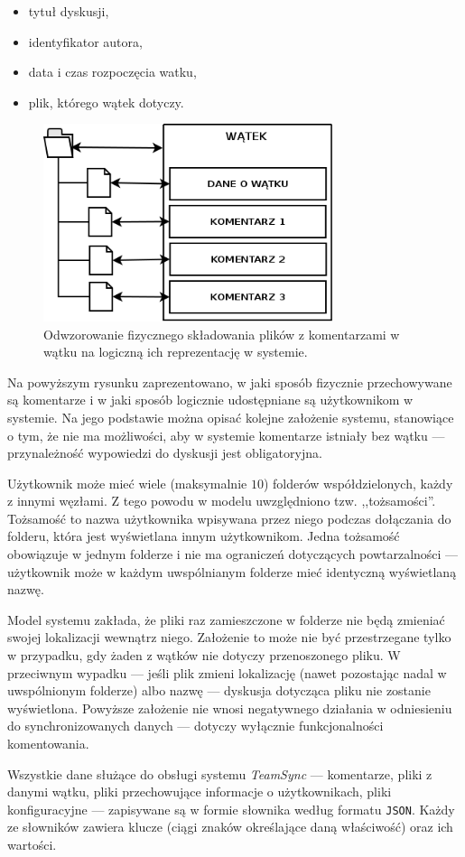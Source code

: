 \begin{itemize}[noitemsep]
 \item tytuł dyskusji,
 \item identyfikator autora,
 \item data i czas rozpoczęcia watku,
 \item plik, którego wątek dotyczy.
\end{itemize}

\begin{figure}[htb]
  \vspace{5pt}
  \begin{center}
    \includegraphics[width=240pt]{figures/folder-thread.png}
  \end{center}
  \caption{Odwzorowanie fizycznego składowania plików z komentarzami w wątku na logiczną ich reprezentację w systemie.}
\end{figure}

Na powyższym rysunku zaprezentowano, w jaki sposób fizycznie przechowywane są komentarze i w jaki sposób logicznie udostępniane są użytkownikom w systemie. Na jego podstawie można opisać kolejne założenie systemu, stanowiące o tym, że nie ma możliwości, aby w systemie komentarze istniały bez wątku --- przynależność wypowiedzi do dyskusji jest obligatoryjna.

Użytkownik może mieć wiele (maksymalnie $10$) folderów współdzielonych, każdy z innymi węzłami. Z tego powodu w modelu uwzględniono tzw. ,,tożsamości''. Tożsamość to nazwa użytkownika wpisywana przez niego podczas dołączania do folderu, która jest wyświetlana innym użytkownikom. Jedna tożsamość obowiązuje w jednym folderze i nie ma ograniczeń dotyczących powtarzalności --- użytkownik może w każdym uwspólnianym folderze mieć identyczną wyświetlaną nazwę.

Model systemu zakłada, że pliki raz zamieszczone w folderze nie będą zmieniać swojej lokalizacji wewnątrz niego. Założenie to może nie być przestrzegane tylko w przypadku, gdy żaden z wątków nie dotyczy przenoszonego pliku. W przeciwnym wypadku --- jeśli plik zmieni lokalizację (nawet pozostając nadal w uwspólnionym folderze) albo nazwę --- dyskusja dotycząca pliku nie zostanie wyświetlona. Powyższe założenie nie wnosi negatywnego działania w odniesieniu do synchronizowanych danych --- dotyczy wyłącznie funkcjonalności komentowania.

Wszystkie dane służące do obsługi systemu \emph{TeamSync} --- komentarze, pliki z danymi wątku, pliki przechowujące informacje o użytkownikach, pliki konfiguracyjne --- zapisywane są w formie słownika według formatu \texttt{JSON}. Każdy ze słowników zawiera klucze (ciągi znaków określające daną właściwość) oraz ich wartości.